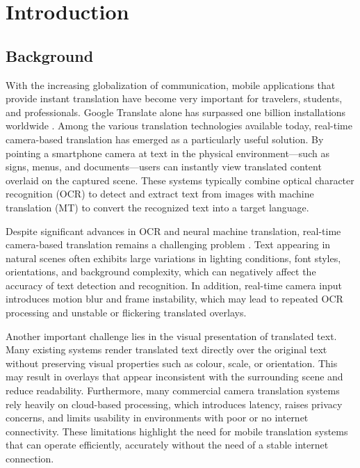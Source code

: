 \chapter{Introduction}

\section{Background}

With the increasing globalization of communication, mobile applications that provide instant translation have become very important for travelers, students, and professionals. Google Translate alone has surpassed one billion installations worldwide \cite{pitman2021googletranslate}. Among the various translation technologies available today, real-time camera-based translation has emerged as a particularly useful solution. By pointing a smartphone camera at text in the physical environment—such as signs, menus, and documents—users can instantly view translated content overlaid on the captured scene. These systems typically combine optical character recognition (OCR) to detect and extract text from images with machine translation (MT) to convert the recognized text into a target language.

Despite significant advances in OCR and neural machine translation, real-time camera-based translation remains a challenging problem \cite{ocr_issues}. Text appearing in natural scenes often exhibits large variations in lighting conditions, font styles, orientations, and background complexity, which can negatively affect the accuracy of text detection and recognition. In addition, real-time camera input introduces motion blur and frame instability, which may lead to repeated OCR processing and unstable or flickering translated overlays.

Another important challenge lies in the visual presentation of translated text. Many existing systems render translated text directly over the original text without preserving visual properties such as colour, scale, or orientation. This may result in overlays that appear inconsistent with the surrounding scene and reduce readability. Furthermore, many commercial camera translation systems rely heavily on cloud-based processing, which introduces latency, raises privacy concerns, and limits usability in environments with poor or no internet connectivity. These limitations highlight the need for mobile translation systems that can operate efficiently, accurately without the need of a stable internet connection.

